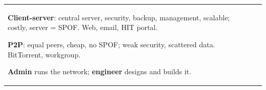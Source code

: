 \documentclass[10pt]{article}
\begin{document}
\begin{cheatsheet}
\begin{tabularx}{\linewidth}{@{}XX@{}}
\textbf{Client-server}: central server, security, backup, management, scalable; costly, server = SPOF. Web, email, HIT portal.\par
\textbf{P2P}: equal peers, cheap, no SPOF; weak security, scattered data. BitTorrent, workgroup.

\textbf{Admin} runs the network; \textbf{engineer} designs and builds it.
\end{tabularx}
\end{cheatsheet}
\end{document}
